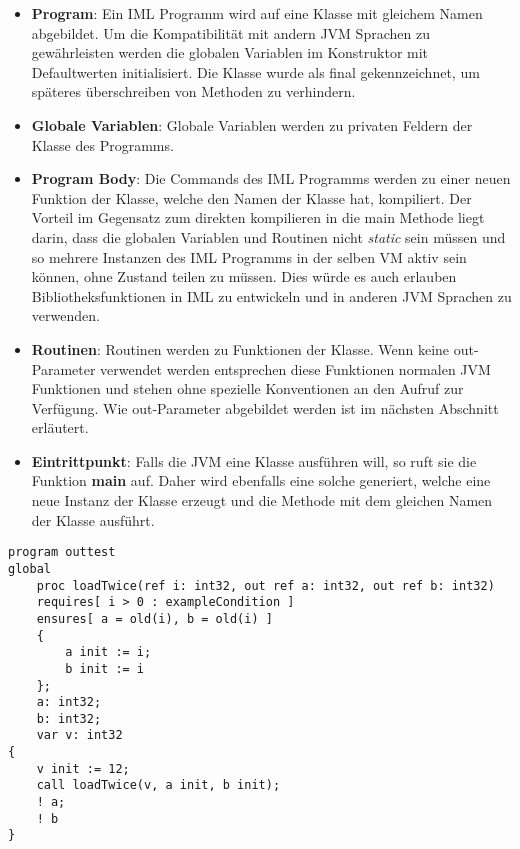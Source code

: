 \begin{itemize}
    \item \textbf{Program}: Ein IML Programm wird auf eine Klasse mit gleichem Namen abgebildet.
                            Um die Kompatibilität mit andern JVM Sprachen zu gewährleisten werden die globalen
                            Variablen im Konstruktor mit Defaultwerten initialisiert. Die Klasse wurde als final 
                            gekennzeichnet, um späteres überschreiben von Methoden zu verhindern.
    \item \textbf{Globale Variablen}: Globale Variablen werden zu privaten Feldern der Klasse des Programms.
    \item \textbf{Program Body}: Die Commands des IML Programms werden zu einer neuen Funktion der Klasse,
                                 welche den Namen der Klasse hat, kompiliert. Der Vorteil im Gegensatz zum 
                                 direkten kompilieren in die main Methode liegt darin, dass die globalen Variablen 
                                 und Routinen nicht \textit{static} sein müssen und so mehrere Instanzen des 
                                 IML Programms in der selben VM aktiv sein können, ohne Zustand teilen zu müssen. 
                                 Dies würde es auch erlauben Bibliotheksfunktionen in IML zu entwickeln und 
                                 in anderen JVM Sprachen zu verwenden.
    \item \textbf{Routinen}: Routinen werden zu Funktionen der Klasse. Wenn keine out-Parameter verwendet
                             werden entsprechen diese Funktionen normalen JVM Funktionen und stehen ohne 
                             spezielle Konventionen an den Aufruf zur Verfügung. Wie out-Parameter abgebildet 
                             werden ist im nächsten Abschnitt erläutert.
    \item \textbf{Eintrittpunkt}: Falls die JVM eine Klasse ausführen will, so ruft sie die Funktion \textbf{main}
                                  auf. Daher wird ebenfalls eine solche generiert, welche eine neue Instanz der 
                                  Klasse erzeugt und die Methode mit dem gleichen Namen der Klasse ausführt.
\end{itemize}
\vspace{0.5cm}
\begin{lstlisting}[caption=Laden eines Int-Wertes in zwei Speicherstellen über out Parameter,label={lst:outtest}]
program outtest
global
    proc loadTwice(ref i: int32, out ref a: int32, out ref b: int32)
    requires[ i > 0 : exampleCondition ]
    ensures[ a = old(i), b = old(i) ]
    {
        a init := i;
        b init := i
    };
    a: int32;
    b: int32;
    var v: int32
{
    v init := 12;
    call loadTwice(v, a init, b init);
    ! a;
    ! b
}
\end{lstlisting}

